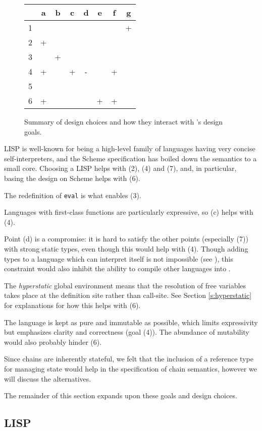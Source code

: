\begin{figure}[H]
\small
\begin{tabular}{l|ccccccc}
    & a & b & c & d & e & f & g\\
  \hline
  1 &   &   &   &   &   &   & + \\
  2 & + &   &   &   &   &   & \\
  3 &   & +\\
  4 & + &   & + & - &   & +\\
  5 & \\
  6 & + &   &   &   & + & +
\end{tabular}
\normalsize
\caption{Summary of design choices and how they interact with \rad{}'s design goals.}
\end{figure}

LISP is well-known for being a high-level family of languages having very concise
self-interpreters, and the Scheme specification has boiled down the
semantics to a small core. Choosing a LISP helps with (2), (4) and (7), and, in
particular, basing the design on Scheme helps with (6).

The redefinition of \texttt{eval} is what enables (3).

Languages with first-class functions are particularly expressive, so (c) helps
with (4).


Point (d) is a compromise: it is hard to satisfy the other points (especially
(7)) with strong static types, even though this would help with (4). Though
adding types to a language which can interpret itself is not impossible (see
\cite{brown-papers}), this constraint would also inhibit the ability to
compile other languages into \rad{}.

The \emph{hyperstatic} global environment means that the resolution of free
variables takes place at the definition site rather than call-site. See Section
\ref{s:hyperstatic} for explanations for how this helps with (6).

The language is kept as pure and immutable as possible, which limits
expressivity but emphasizes clarity and correctness (goal (4)). The abundance of
mutability would also probably hinder (6).

Since chains are inherently stateful, we felt that the inclusion of a reference
type for managing state would help in the specification of chain semantics, however
we will discuss the alternatives.

The remainder of this section expands upon these goals and
design choices.


\subsection{LISP}

